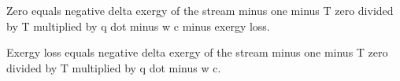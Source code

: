 Zero equals negative delta exergy of the stream minus one minus T zero divided by T multiplied by q dot minus w c minus exergy loss.  

Exergy loss equals negative delta exergy of the stream minus one minus T zero divided by T multiplied by q dot minus w c.